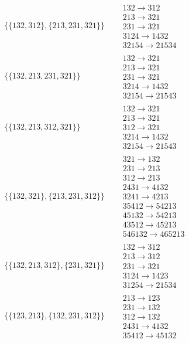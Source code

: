 \begin{tiny}
\begin{align}
\begin{matrix}
\end{matrix}
\\
\{\{132, 312\}, \{213, 231, 321\}\}
\quad
&
\begin{matrix}
132 \to 312\\213 \to 321\\231 \to 321\\3124 \to 1432\\32154 \to 21534
\end{matrix}
\\
\{\{132, 213, 231, 321\}\}
\quad
&
\begin{matrix}
132 \to 321\\213 \to 321\\231 \to 321\\3214 \to 1432\\32154 \to 21543
\end{matrix}
\\
\{\{132, 213, 312, 321\}\}
\quad
&
\begin{matrix}
132 \to 321\\213 \to 321\\312 \to 321\\3214 \to 1432\\32154 \to 21543
\end{matrix}
\\
\{\{132, 321\}, \{213, 231, 312\}\}
\quad
&
\begin{matrix}
321 \to 132\\231 \to 213\\312 \to 213\\2431 \to 4132\\3241 \to 4213\\35412 \to 54213\\45132 \to 54213\\43512 \to 45213\\546132 \to 465213
\end{matrix}
\\
\{\{132, 213, 312\}, \{231, 321\}\}
\quad
&
\begin{matrix}
132 \to 312\\213 \to 312\\231 \to 321\\3124 \to 1423\\31254 \to 21534
\end{matrix}
\\
\{\{123, 213\}, \{132, 231, 312\}\}
\quad
&
\begin{matrix}
213 \to 123\\231 \to 132\\312 \to 132\\2431 \to 4132\\35412 \to 45132

\end{matrix}
\end{align}
\end{tiny}
